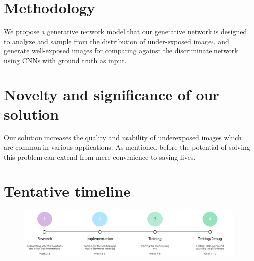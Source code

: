 \documentclass{article}
\begin{document}
\section{Methodology}
We propose a generative network model that our generative network is designed to analyze and sample from the distribution of under-exposed images, and generate well-exposed images for comparing against the discriminate network using CNNs with ground truth as input. 
\section{Novelty and significance of our solution}
Our solution increases the quality and usability of underexposed images which are common in various applications. As mentioned before the potential of solving this problem can extend from mere convenience to saving lives.
\section{Tentative timeline}
\begin{figure}[h]
  \centering
  \includegraphics[width=\textwidth]{timeline.png}
\end{figure}

\medskip
\printbibliography %
\end{document}
